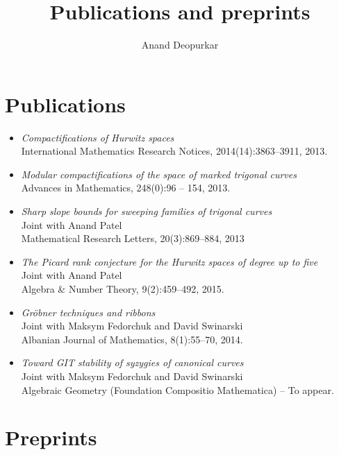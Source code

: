 \documentclass[12pt]{amsart}
\title{Publications and preprints}
\author{Anand Deopurkar}
\begin{document}
\maketitle

\section{Publications}

\begin{itemize}
  \setlength{\itemsep}{.5em}
  
\item
  {\em Compactifications of {Hurwitz} spaces}\\
  {International Mathematics Research Notices}, 2014(14):3863--3911, 2013.

\item
  {\em Modular compactifications of the space of marked trigonal curves}\\
 {Advances in Mathematics}, 248(0):96 -- 154, 2013.


\item
  {\em Sharp slope bounds for sweeping families of trigonal curves}\\
  Joint with Anand {Patel}\\
 {Mathematical Research Letters}, 20(3):869--884, 2013

\item
  {\em The {P}icard rank conjecture for the {H}urwitz spaces of degree up to five}\\
 Joint with Anand Patel\\
 {Algebra \& Number Theory}, 9(2):459--492, 2015.

\item
  {\em Gr\"obner techniques and ribbons}\\
  Joint with Maksym Fedorchuk and David Swinarski\\
  {Albanian Journal of Mathematics}, 8(1):55--70, 2014.

\item
  {\em Toward GIT stability of syzygies of canonical curves}\\
  Joint with Maksym {Fedorchuk} and David {Swinarski}\\
  {Algebraic Geometry (Foundation Compositio Mathematica) -- To appear}.

\end{itemize}


\section{Preprints}
\end{document}
